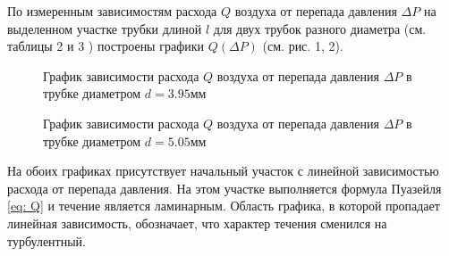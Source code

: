 По измеренным зависимостям расхода $Q$ воздуха от перепада давления $\Delta P$ на выделенном участке трубки длиной $l$ для двух трубок разного диаметра (см. таблицы 2 и 3 ) построены графики $Q(\Delta P)$ (см. рис. 1, 2).
\newpage
\begin{figure}[ht]
    \label{figure5}
    \caption{График зависимости расхода $Q$ воздуха от перепада давления $\Delta P$ в трубке диаметром $d = 3.95\text{мм}$}
\end{figure}
\begin{figure}[ht]
    \label{figure6}
    \caption{График зависимости расхода $Q$ воздуха от перепада давления $\Delta P$ в трубке диаметром $d = 5.05\text{мм}$}
\end{figure}
\newpage
На обоих графиках присутствует начальный участок с линейной зависимостью расхода от перепада давления. На этом участке выполняется формула Пуазейля \eqref{eq: Q} и течение является ламинарным. Область графика, в которой пропадает линейная зависимость, обозначает, что характер течения сменился на турбулентный.


